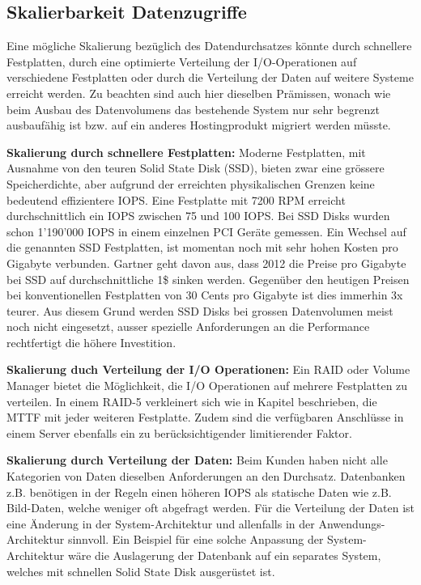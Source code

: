 \subsection{Skalierbarkeit Datenzugriffe}
Eine mögliche Skalierung bezüglich des Datendurchsatzes könnte durch schnellere Festplatten, durch eine optimierte Verteilung der I/O-Operationen auf verschiedene Festplatten oder durch die Verteilung der Daten auf weitere Systeme erreicht werden. Zu beachten sind auch hier dieselben Prämissen, wonach wie beim Ausbau des Datenvolumens das bestehende System nur sehr begrenzt ausbaufähig ist bzw. auf ein anderes Hostingprodukt migriert werden müsste.

\textbf{Skalierung durch schnellere Festplatten:}
Moderne Festplatten, mit Ausnahme von den teuren Solid State Disk (SSD), bieten zwar eine grössere Speicherdichte, aber aufgrund der erreichten physikalischen Grenzen keine bedeutend effizientere IOPS. Eine Festplatte mit 7200 RPM erreicht durchschnittlich ein IOPS zwischen 75 und 100 IOPS. Bei SSD Disks wurden schon 1'190'000 IOPS in einem einzelnen PCI Geräte gemessen. \cite{Symantec2011} \cite{Fusionio} 
Ein Wechsel auf die genannten SSD Festplatten, ist momentan noch mit sehr hohen Kosten pro Gigabyte verbunden. Gartner geht davon aus, dass 2012 die Preise pro Gigabyte bei SSD auf durchschnittliche 1\$ sinken werden. Gegenüber den heutigen Preisen bei konventionellen Festplatten von 30 Cents pro Gigabyte ist dies immerhin 3x teurer. Aus diesem Grund werden SSD Disks bei grossen Datenvolumen meist noch nicht eingesetzt, ausser spezielle Anforderungen an die Performance rechtfertigt die höhere Investition. \cite{AgamShah2011}

\textbf{Skalierung duch Verteilung der I/O Operationen:}
Ein RAID oder Volume Manager bietet die Möglichkeit, die I/O Operationen auf mehrere Festplatten zu verteilen. In einem RAID-5 verkleinert sich wie in Kapitel  beschrieben, die MTTF mit jeder weiteren Festplatte. Zudem sind die verfügbaren Anschlüsse in einem Server ebenfalls ein zu berücksichtigender limitierender Faktor.

\textbf{Skalierung durch Verteilung der Daten:}
Beim Kunden haben nicht alle Kategorien von Daten dieselben Anforderungen an den Durchsatz. Datenbanken z.B. benötigen in der Regeln einen höheren IOPS als statische Daten wie z.B. Bild-Daten, welche weniger oft abgefragt werden. Für die Verteilung der Daten ist eine Änderung in der System-Architektur und allenfalls in der Anwendungs-Architektur sinnvoll. Ein Beispiel für eine solche Anpassung der System-Architektur wäre die Auslagerung der Datenbank auf ein separates System, welches mit schnellen Solid State Disk ausgerüstet ist. 

